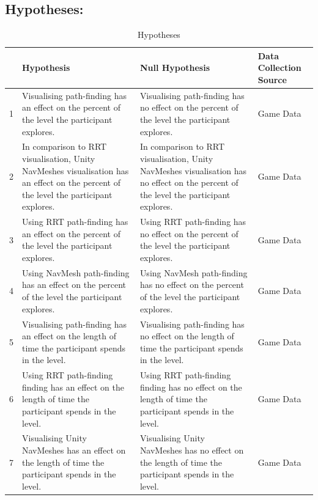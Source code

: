 \documentclass[journal]{IEEEtran}
\begin{document}
	\subsection{Hypotheses:} \label{hypothesis}
	\begin{table}[h]
		\centering
		\caption{Hypotheses}
		\label{table:Hypothesis}
		\def\arraystretch{1.5}
		\begin{tabular}{|c|p{7cm}|p{7cm}|p{1.75cm}|}
			\hline
			& \textbf{Hypothesis}& \textbf{Null Hypothesis} & \textbf{Data Collection Source}\\
			\hline
			1 & Visualising path-finding has an effect on the percent of the level the participant explores.
			& Visualising path-finding has no effect on the percent of the level the participant explores.
			& Game Data \\ \hline
			
			2 & In comparison to RRT visualisation, Unity NavMeshes visualisation has an effect on the percent of the level the participant explores.
			& In comparison to RRT visualisation, Unity NavMeshes visualisation has no effect on the percent of the level the participant explores.
			& Game Data \\ \hline
			
			3 & Using RRT path-finding has an effect on the percent of the level the participant explores.
			& Using RRT path-finding has no effect on the percent of the level the participant explores.
			& Game Data \\ \hline
			
			4 & Using NavMesh path-finding has an effect on the percent of the level the participant explores.
			& Using NavMesh path-finding has no effect on the percent of the level the participant explores.
			& Game Data \\ \hline
			
			5 & Visualising path-finding has an effect on the length of time the participant spends in the level. 
			& Visualising path-finding has no effect on the length of time the participant spends in the level. 
			& Game Data \\ \hline
			
			6 & Using RRT path-finding finding has an effect on the length of time the participant spends in the level. 
			& Using RRT path-finding finding has no effect on the length of time the participant spends in the level. 
			& Game Data \\ \hline
			
			7 & Visualising Unity NavMeshes has an effect on the length of time the participant spends in the level. 
			& Visualising Unity NavMeshes has no effect on the length of time the participant spends in the level.
			& Game Data \\ \hline
			

\end{tabular}
\end{table}
\end{document}
